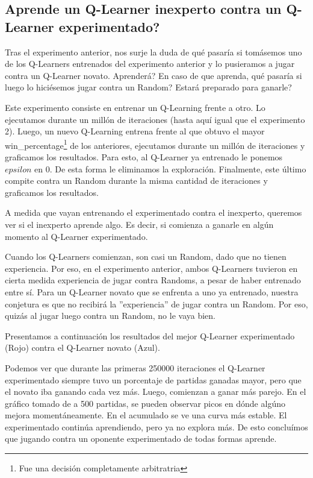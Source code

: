 \subsection{Aprende un Q-Learner inexperto contra un Q-Learner experimentado?}

Tras el experimento anterior, nos surje la duda de qué pasaría si tomásemos uno de los Q-Learners entrenados del experimento anterior y lo pusieramos a jugar contra un Q-Learner novato. Aprenderá? En caso de que aprenda, qué pasaría si luego lo hiciésemos jugar contra un Random? Estará preparado para ganarle?

Este experimento consiste en entrenar un Q-Learning frente a otro. Lo ejecutamos durante un mill\'on de iteraciones (hasta aqu\'i igual que el experimento 2). Luego, un nuevo Q-Learning entrena frente al que obtuvo el mayor win\_percentage\footnote{Fue una decisi\'on completamente arbitratria} de los anteriores, ejecutamos durante un mill\'on de iteraciones y graficamos los resultados. Para esto, al Q-Learner ya entrenado le ponemos $epsilon$ en 0. De esta forma le eliminamos la exploración. Finalmente, este \'ultimo compite contra un Random durante la misma cantidad de iteraciones y graficamos los resultados.

A medida que vayan entrenando el experimentado contra el inexperto, queremos ver si el inexperto aprende algo. Es decir, si comienza a ganarle en algún momento al Q-Learner experimentado.

Cuando los Q-Learners comienzan, son casi un Random, dado que no tienen experiencia. Por eso, en el experimento anterior, ambos Q-Learners tuvieron en cierta medida experiencia de jugar contra Randoms, a pesar de haber entrenado entre sí. Para un Q-Learner novato que se enfrenta a uno ya entrenado, nuestra conjetura es que no recibirá la ''experiencia'' de jugar contra un Random. Por eso, quizás al jugar luego contra un Random, no le vaya bien.

Presentamos a continuación los resultados del mejor Q-Learner experimentado (Rojo) contra el Q-Learner novato (Azul).



Podemos ver que durante las primeras 250000 iteraciones el Q-Learner experimentado siempre tuvo un porcentaje de partidas ganadas mayor, pero que el novato iba ganando cada vez más. Luego, comienzan a ganar más parejo. En el gráfico tomado de a 500 partidas, se pueden observar picos en dónde algúno mejora momentáneamente. En el acumulado se ve una curva más estable. El experimentado continúa aprendiendo, pero ya no explora más. De esto concluímos que jugando contra un oponente experimentado de todas formas aprende.

